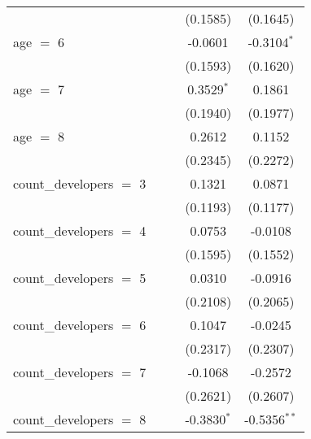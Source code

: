 \begin{tabular}{lcccc}
                                        &               &                & (0.1585)       & (0.1645)\\   
   age $=$ 6                            &               &                & -0.0601        & -0.3104$^{*}$\\   
                                        &               &                & (0.1593)       & (0.1620)\\   
   age $=$ 7                            &               &                & 0.3529$^{*}$   & 0.1861\\   
                                        &               &                & (0.1940)       & (0.1977)\\   
   age $=$ 8                            &               &                & 0.2612         & 0.1152\\   
                                        &               &                & (0.2345)       & (0.2272)\\   
   count\_developers $=$ 3              &               &                & 0.1321         & 0.0871\\   
                                        &               &                & (0.1193)       & (0.1177)\\   
   count\_developers $=$ 4              &               &                & 0.0753         & -0.0108\\   
                                        &               &                & (0.1595)       & (0.1552)\\   
   count\_developers $=$ 5              &               &                & 0.0310         & -0.0916\\   
                                        &               &                & (0.2108)       & (0.2065)\\   
   count\_developers $=$ 6              &               &                & 0.1047         & -0.0245\\   
                                        &               &                & (0.2317)       & (0.2307)\\   
   count\_developers $=$ 7              &               &                & -0.1068        & -0.2572\\   
                                        &               &                & (0.2621)       & (0.2607)\\   
   count\_developers $=$ 8              &               &                & -0.3830$^{*}$  & -0.5356$^{**}$\\   

\end{tabular}
